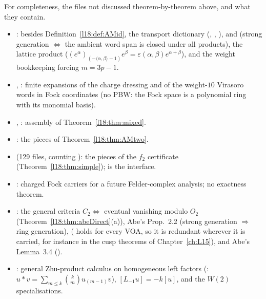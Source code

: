 For completeness, the files not discussed theorem-by-theorem above, and what they contain.
\begin{itemize}
\item {}: besides Definition~\ref{l18:def:AMid}, the transport dictionary
  (, , ),  and 
  (strong generation $\iff$ the ambient word span is closed under all products), the lattice product
   ($(e^\alpha)_{(-\langle\alpha,\beta\rangle-1)}e^\beta=\varepsilon(\alpha,\beta)e^{\alpha+\beta}$), and the weight
  bookkeeping forcing $m=3p-1$.
\item {}, : finite expansions of the
  charge dressing and of the weight-$10$ Virasoro words in Fock coordinates (no PBW: the Fock space is a polynomial
  ring with its monomial basis).
\item {}, : assembly of
  Theorem~\ref{l18:thm:mixed}.
\item {}: the pieces of
  Theorem~\ref{l18:thm:AMtwo}.
\item {} (129 files, counting ): the pieces of the $f_2$
  certificate (Theorem~\ref{l18:thm:simple}); \allowbreak{}\allowbreak{}\allowbreak{}\allowbreak{}
  is the interface.
\item {}: charged Fock carriers for a future Felder-complex analysis; no
  exactness theorem.
\item {}: the general criteria $C_2\iff$ eventual vanishing modulo $O_2$
  (Theorem~\ref{l18:thm:abeDirect}(a)), Abe's Prop.~2.2 (strong generation $\Rightarrow$ ring generation),
   ( holds for every VOA, so it is redundant wherever it is carried,
  for instance in the cusp theorems of Chapter~\ref{ch:L15}), and Abe's Lemma~3.4 ().
\item {}: general Zhu-product calculus on homogeneous left factors
  (: $u*v=\sum_{m\le k}\binom km u_{(m-1)}v$), $[L_{-1}u]=-k[u]$, and the $W(2)$
  specialisations.
\end{itemize}

